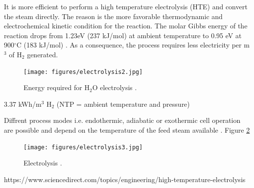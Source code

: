 \documentclass[11pt,letterpaper]{article}
\begin{document}
It is more efficient to perform a high temperature electrolysis (HTE) and convert the steam directly. The reason is the more favorable thermodynamic and electrochemical kinetic condition for the reaction. The molar Gibbs energy of the reaction drops from 1.23eV (237 kJ/mol) at ambient temperature to 0.95 eV at 900$^{\circ}$C (183 kJ/mol) \cite{helmeth_high_2020}. As a consequence, the process requires less electricity per m$^3$ of H$_2$ generated.

\begin{figure}[] %
	\centering
	\texttt{[image: figures/electrolysis2.jpg]}
	\hfill
	\caption{ Energy required for H$_2$O electrolysis \cite{helmeth_high_2020}.}
	\label{fig:nf2}
\end{figure}

3.37 kWh/m$^3$ H$_2$ (NTP = ambient temperature and pressure)
\cite{helmeth_high_2020}

Diffrent process modes i.e. endothermic, adiabatic or exothermic cell operation are possible and depend on the temperature of the feed steam available \cite{doenitz_concepts_1982}. Figure \ref{fig:electro3}


\begin{figure}[] %
	\centering
	\texttt{[image: figures/electrolysis3.jpg]}
	\hfill
	\caption{ Electrolysis \cite{doenitz_concepts_1982}.}
	\label{fig:electro3}
\end{figure}


https://www.sciencedirect.com/topics/engineering/high-temperature-electrolysis

\pagebreak


\end{document}
